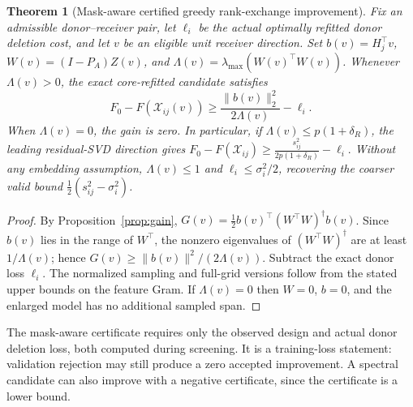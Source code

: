 \documentclass[review,10pt]{elsarticle}
\newtheorem{theorem}{Theorem}
\newcommand{\cX}{\mathcal X}
\begin{document}
\begin{theorem}[Mask-aware certified greedy rank-exchange improvement]\label{thm:certificate}
Fix an admissible donor--receiver pair, let $\ell_i$ be the \emph{actual} optimally refitted donor deletion cost, and let $v$ be an eligible unit receiver direction. Set $b(v)=H_j^\top v$, $W(v)=(I-P_A)Z(v)$, and $\Lambda(v)=\lambda_{\max}(W(v)^\top W(v))$. Whenever $\Lambda(v)>0$, the exact core-refitted candidate satisfies
\begin{equation}\label{eq:certgain}
\boxed{\;F_0-F(\cX_{ij}(v))\ge
\frac{\|b(v)\|_2^2}{2\Lambda(v)}-\ell_i.\;}
\end{equation}
When $\Lambda(v)=0$, the gain is zero. In particular, if $\Lambda(v)\le p(1+\delta_R)$, the leading residual-SVD direction gives
 \(F_0-F(\cX_{ij})\ge \frac{s_{ij}^2}{2p(1+\delta_R)}-\ell_i.\) 
Without any embedding assumption, $\Lambda(v)\le1$ and $\ell_i\le\sigma_i^2/2$, recovering the coarser valid bound $\tfrac12(s_{ij}^2-\sigma_i^2)$.
\end{theorem}
\begin{proof}
By Proposition~\ref{prop:gain}, $G(v)=\tfrac12 b(v)^\top(W^\top W)^\dagger b(v)$. Since $b(v)$ lies in the range of $W^\top$, the nonzero eigenvalues of $(W^\top W)^\dagger$ are at least $1/\Lambda(v)$; hence $G(v)\ge\|b(v)\|^2/(2\Lambda(v))$. Subtract the exact donor loss $\ell_i$. The normalized sampling and full-grid versions follow from the stated upper bounds on the feature Gram. If $\Lambda(v)=0$ then $W=0$, $b=0$, and the enlarged model has no additional sampled span.\end{proof}

The mask-aware certificate requires only the observed design and actual donor deletion loss, both computed during screening. It is a training-loss statement: validation rejection may still produce a zero accepted improvement. A spectral candidate can also improve with a negative certificate, since the certificate is a lower bound.
\end{document}
